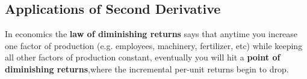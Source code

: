 \subsection*{Applications of Second Derivative}
\begin{tcolorbox}[title={Law of Diminishing Returns\footnotemark[1]}]
In economics the \textbf{law of diminishing returns} says that anytime you increase one factor of production (e.g.  employees, machinery, fertilizer, etc) while keeping all other factors of production constant, eventually you will hit a \textbf{point of diminishing returns},where the incremental per-unit returns begin to drop.
\end{tcolorbox}
